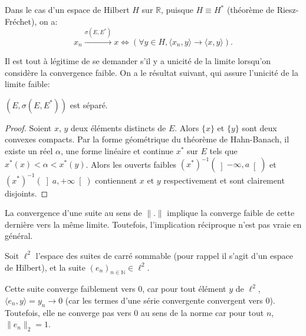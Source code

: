 Dans le cas d'un espace de Hilbert $H$ sur $\mathbb R$, puisque $H\equiv H^*$
(théorème de Riesz-Fréchet), on a:
$$x_n\xrightarrow{\sigma(E, E^*)}x \iff
\left(\forall y\in H, \langle x_n, y\rangle \to \langle x, y\rangle\right).$$

Il est tout à légitime de se demander s'il y a unicité de la limite
lorsqu'on considère la convergence faible. On a le résultat suivant, qui
assure l'unicité de la limite faible:
\begin{prop}
  $(E, \sigma(E, E^*))$ est séparé.
\end{prop}

\begin{proof}
  Soient $x$, $y$ deux éléments distincts de $E$. Alors $\{x\}$ et
  $\{y\}$ sont deux convexes compacts.
  Par la forme géométrique du théorème de Hahn-Banach, il existe
  un réel $\alpha$, une forme linéaire et continue $x^*$ sur $E$
  tels que $x^*(x) < \alpha < x^*(y)$.
  Alors les ouverts faibles $(x^*)^{-1}(\left]-\infty, a\right[)$
  et $(x^*)^{-1}(\left]a, +\infty\right[)$ contiennent $x$
  et $y$ respectivement et sont clairement disjoints.
\end{proof}

\begin{rem}
  La convergence d'une suite au sens de $\|.\|$ implique la converge faible
  de cette dernière vers la même limite. Toutefois, l'implication réciproque
  n'est pas vraie en général.

  Soit $\ell^2$ l'espace des suites de carré sommable
  (pour rappel il s'agit d'un espace
  de Hilbert), et la suite $(e_n)_{n\in\mathbb N}\in \ell^2$.

  Cette suite converge faiblement vers $0$, car pour tout élément
  $y$ de $\ell^2$, $\langle e_n, y\rangle = y_n \to 0$ (car
  les termes d'une série convergente convergent vers $0$).
  Toutefois, elle ne converge pas vers $0$ au sens de la norme
  car pour tout $n$, $\|e_n\|_2 = 1$.
\end{rem}
